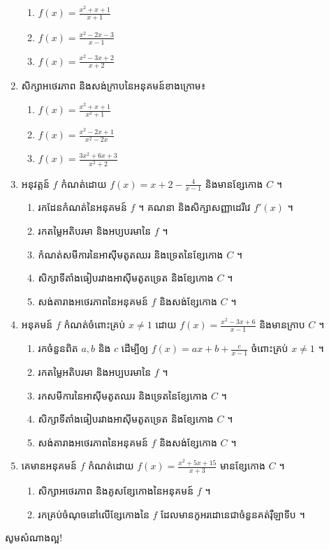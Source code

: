\documentclass[12pt,a4paper]{article}
\begin{document}
\begin{enumerate}[m]
\begin{multicols}{3}
\begin{enumerate}[k]
		\item $f(x)=\frac{x^2+x+1}{x+1}$
		\item $f(x)=\frac{x^2-2x-3}{x-1}$
		\item $f(x)=\frac{x^2-3x+2}{x+2}$
		\end{enumerate}
	\end{multicols}
\item សិក្សាអថេរភាព និងសង់ក្រាបនៃអនុគមន៍ខាងក្រោម៖ 
	\begin{multicols}{3}
		\begin{enumerate}[k]
		\item $f(x)=\frac{x^2+x+1}{x^2+1}$
		\item $f(x)=\frac{x^2-2x+1}{x^2-2x}$
		\item $f(x)=\frac{3x^2+6x+3}{x^2+2}$
		\end{enumerate}
	\end{multicols}

\item អនុវត្តន៍ $ f $ កំណត់ដោយ $f(x)=x+2-\frac{4}{x-1}$ និងមានខ្សែកោង $C$ ។
	\begin{enumerate}[k]
		\item រកដែនកំណត់នៃអនុគមន៍ $f$ ។ គណនា និងសិក្សាសញ្ញាដេរីវេ $f'(x)$ ។
		\item រកតម្លៃអតិបរមា និងអប្យបរមានៃ $f$ ។
		\item កំណត់សមីការនៃអាស៊ីមតូតឈរ និងទ្រេតនៃខ្សែកោង $C$ ។
		\item សិក្សាទីតាំងធៀបរវាងអាស៊ីមតូតទ្រេត និងខ្សែកោង $C$ ។
		\item សង់តារាងអថេរភាពនៃអនុគមន៍ $f$ និងសង់ខ្សែកោង $C$ ។
	\end{enumerate}
\item អនុគមន៍ $f$ កំណត់ចំពោះគ្រប់ $x\neq 1$ ដោយ $f(x)=\frac{x^2-3x+6}{x-1}$ និងមានក្រាប $C$ ។
	\begin{enumerate}[k]
		\item រកចំនួនពិត $a, b$ និង $c$ ដើម្បីឲ្យ $f(x)=ax+b+\frac{c}{x-1}$ ចំពោះគ្រប់ $x\neq1$ ។
		\item រកតម្លៃអតិបរមា និងអប្បបរមានៃ $f$ ។
		\item រកសមីការនៃអាស៊ីមតូតឈរ និងទ្រេតនៃខ្សែកោង $C$ ។
		\item សិក្សាទីតាំងធៀបរវាងអាស៊ីមតូតទ្រេត និងខ្សែកោង $C$ ។
		\item សង់តារាងអថេរភាពនៃអនុគមន៍ $f$ និងសង់ខ្សែកោង $C$ ។
	\end{enumerate}
\item  គេមានអនុគមន៍ $f$ កំណត់ដោយ $f(x)=\frac{x^2+5x+15}{x+3}$ មានខ្សែកោង $C$ ។
	\begin{enumerate}[k]
		\item សិក្សាអថេរភាព និងគូសខ្សែកោងនៃអនុគមន៍ $f$ ។
		\item រកគ្រប់ចំណុចនៅលើខ្សែកោងនៃ $f$ ដែលមានកូអរដោនេជាចំនួនគត់រ៉ឺឡាទីប ។
	\end{enumerate}
\end{enumerate}
\begin{center}
\sffamily\color{blue}
សូមសំណាងល្អ!
\end{center}
\end{document}
